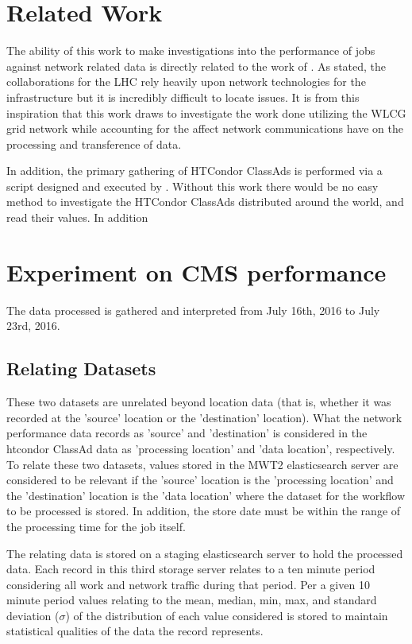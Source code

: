 \documentclass[sigconf]{acmart}
\begin{document}
\section{Related Work}
The ability of this work to make investigations into the performance of jobs against network related data is directly related to the work of \cite{shawn}. As stated, the collaborations for the LHC rely heavily upon network technologies for the infrastructure but it is incredibly difficult to locate issues. It is from this inspiration that this work draws to investigate the work done utilizing the WLCG grid network while accounting for the affect network communications have on the processing and transference of data.

In addition, the primary gathering of HTCondor ClassAds is performed via a script designed and executed by \cite{brian}. Without this work there would be no easy method to investigate the HTCondor ClassAds distributed around the world, and read their values. In addition
\section{Experiment on CMS performance}
The data processed is gathered and interpreted from July 16th, 2016 to July 23rd, 2016.
\subsection{Relating Datasets}
These two datasets are unrelated beyond location data (that is, whether it was recorded at the 'source' location or the 'destination' location). What the network performance data records as 'source' and 'destination' is considered in the htcondor ClassAd data as 'processing location' and 'data location', respectively. To relate these two datasets, values stored in the MWT2 elasticsearch server are considered to be relevant if the 'source' location is the 'processing location' and the 'destination' location is the 'data location' where the dataset for the workflow to be processed is stored. In addition, the store date must be within the range of the processing time for the job itself. 

The relating data is stored on a staging elasticsearch server to hold the processed data. Each record in this third storage server relates to a ten minute period considering all work and network traffic during that period. Per a given 10 minute period values relating to the mean, median, min, max, and standard deviation ($\sigma$) of the distribution of each value considered is stored to maintain statistical qualities of the data the record represents.
\end{document}
